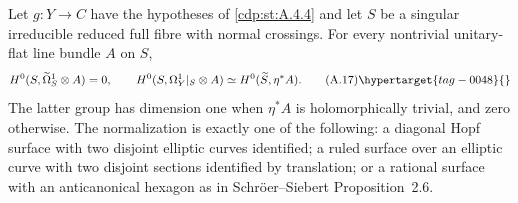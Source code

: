\begin{proposition}\hypertarget{tag-01AU}{}\label{cdp:st:A.4.5}

Let $g:Y\to C$ have the hypotheses of \ref{cdp:st:A.4.4} and let $S$ be a singular irreducible reduced full fibre with normal crossings. For every nontrivial unitary-flat line bundle $A$ on $S$,
\[
H^0(S,\widetilde\Omega_S^1\otimes A)=0,
\qquad
H^0(S,\Omega_Y^1|_S\otimes A)
 \simeq H^0(\widetilde S,\eta^*A).
\tag{A.17}\hypertarget{tag-0048}{}\label{cdp:eq:A.17}
\]
The latter group has dimension one when $\eta^*A$ is holomorphically trivial, and zero otherwise. The normalization is exactly one of the following: a diagonal Hopf surface with two disjoint elliptic curves identified; a ruled surface over an elliptic curve with two disjoint sections identified by translation; or a rational surface with an anticanonical hexagon as in Schr\"oer--Siebert Proposition~2.6.
\end{proposition}


